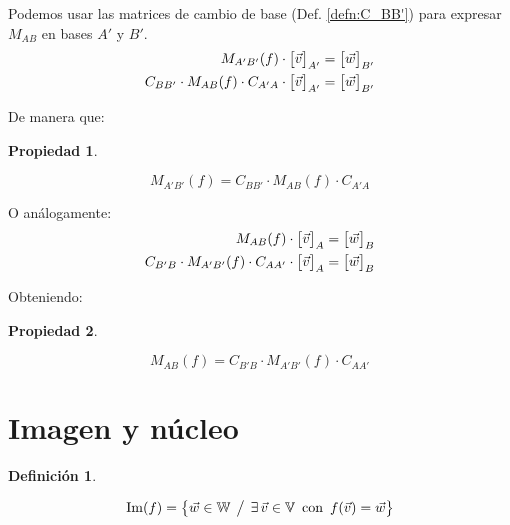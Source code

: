 \documentclass[a5paper,12pt,twoside]{book}
\newtheorem{defn}{{Definición}}[chapter]
\newtheorem{prop}{{Propiedad}}[chapter]
\begin{document}
Podemos usar las matrices de cambio de base (Def. \ref{defn:C_BB'}) para expresar $M_{AB}$ en bases $A'$ y $B'$.
\begin{align*}
    M_{A'B'}(f) \cdot { \begin{bmatrix} \Vec{v} \end{bmatrix} }_{A'} &= { \begin{bmatrix} \Vec{w} \end{bmatrix} }_{B'}
    \\
    C_{BB'} \cdot M_{AB}(f) \cdot C_{A'A} \cdot { \begin{bmatrix} \Vec{v} \end{bmatrix} }_{A'} &= { \begin{bmatrix} \Vec{w} \end{bmatrix} }_{B'}
\end{align*}

De manera que:

\begin{mdframed}[style=PropertyFrame]
    \begin{prop}
    \end{prop}
    \begin{equation*}
        M_{A'B'}(f) = C_{BB'} \cdot M_{AB}(f) \cdot C_{A'A}
    \end{equation*}
\end{mdframed}

O análogamente:
\begin{align*}
    M_{AB}(f) \cdot { \begin{bmatrix} \Vec{v} \end{bmatrix} }_A &= { \begin{bmatrix} \Vec{w} \end{bmatrix} }_B
    \\
    C_{B'B} \cdot M_{A'B'}(f) \cdot C_{AA'} \cdot { \begin{bmatrix} \Vec{v} \end{bmatrix} }_A &= { \begin{bmatrix} \Vec{w} \end{bmatrix} }_B
\end{align*}

Obteniendo:

\begin{mdframed}[style=PropertyFrame]
    \begin{prop}
        \label{prop:M_BB}
    \end{prop}
    \begin{equation*}
        M_{AB}(f) = C_{B'B} \cdot M_{A'B'}(f) \cdot C_{AA'}
    \end{equation*}
\end{mdframed}


\section{Imagen y núcleo}

\begin{mdframed}[style=DefinitionFrame]
    \begin{defn}
    \end{defn}
    \begin{equation*}
        \operatorname{Im}(f) = { \left\{ {\Vec{w} \in \mathbb{W} \hspace{1ex} \big/ \hspace{1ex} \exists \, \Vec{v} \in \mathbb{V} \enspace \textrm{con} \enspace f(\Vec{v}) = \Vec{w}} \right\} }
    \end{equation*}
\end{mdframed}
\end{document}
